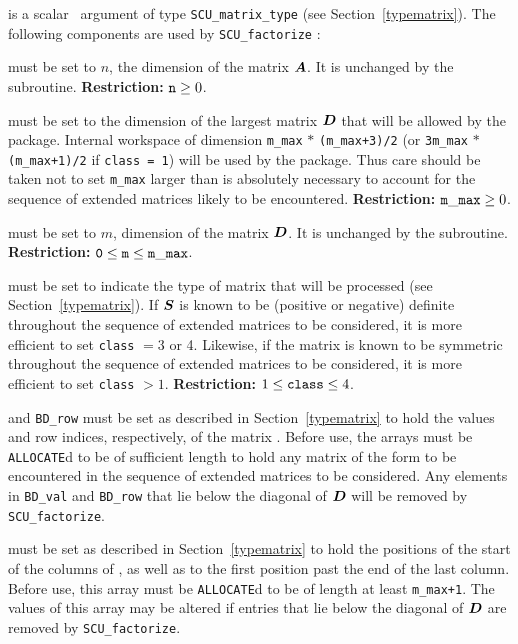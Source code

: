 \documentclass{galahad}
\newcommand{\packagename}{SCU}
\begin{document}
\vspace*{-3mm}
\begin{description}

 is a scalar \intentinout\ argument of type 
{\tt \packagename\_matrix\_type} 
(see Section~\ref{typematrix}). 
The following components are used by {\tt \packagename\_factorize} : 
 
\begin{description} 
 must be set to $n$, the dimension of the matrix $ {\bm{A}}$. 
It is unchanged by the subroutine. {\bf Restriction:} ${\tt n} \geq 0$.
 
 must be set to the 
dimension of the largest matrix ${\bm{D}}$ that will be allowed 
by the package. Internal workspace of dimension 
{\tt m\_max} $\ast$ {\tt (m\_max+3)/2} 
(or {\tt 3m\_max} $\ast$ {\tt (m\_max+1)/2} if {\tt class = 1}) 
will be used by the package. Thus care should be taken not to set {\tt m\_max} 
larger than is absolutely necessary to account for the sequence of  
extended matrices likely to be encountered. 
{\bf Restriction:} ${\tt m\_max} \geq 0$.
 
 must be set to $m$, dimension of the matrix ${\bm{D}}$. 
It is unchanged by the subroutine. 
{\bf Restriction:} ${\tt 0} \leq {\tt m} \leq {\tt m\_max}$.
 
 must be set to indicate the type of matrix that will be
processed (see Section~\ref{typematrix}). 
If ${\bm{S}}$ is known 
to be (positive or negative) definite throughout the sequence 
of extended matrices to be considered, it is more efficient to set 
{\tt class} $= 3$ or 4. Likewise, if the matrix is known 
to be symmetric throughout the sequence 
of extended matrices to be considered, it is more efficient to set 
{\tt class} $> 1$.  
{\bf Restriction:} $1 \leq  {\tt class} \leq 4$. 
 
 and {\tt BD\_row} must be set as described in 
Section~\ref{typematrix}  to hold the values and row indices, respectively, 
of the matrix .  Before use, the arrays must be {\tt ALLOCATE}d 
to be of sufficient length to hold any matrix of the form  
to be encountered in the sequence of 
extended matrices to be considered. Any elements in {\tt BD\_val} and 
{\tt BD\_row} 
that lie below the diagonal of ${\bm{D}}$ will be removed by 
{\tt \packagename\_factorize}. 
 
 must be set as described in Section~\ref{typematrix}
to hold the 
positions of the start of the columns of , as well as to the first 
position past the end of the last column. 
Before use, this array must be {\tt ALLOCATE}d to be of length at least 
{\tt m\_max+1}. 
The values of this array may be altered if entries that lie 
below the diagonal of ${\bm{D}}$ are removed by {\tt \packagename\_factorize}. 
 

\end{description}
\end{description}
\end{document}

